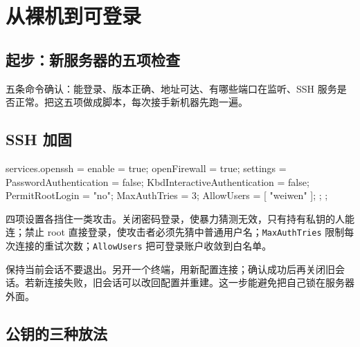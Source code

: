 \chapter{从裸机到可登录}
\label{ch:server-access}

\section{起步：新服务器的五项检查}


五条命令确认：能登录、版本正确、地址可达、有哪些端口在监听、SSH 服务是否正常。把这五项做成脚本，每次接手新机器先跑一遍。

\section{SSH 加固}

\begin{nixcode}
services.openssh = {
  enable = true;
  openFirewall = true;
  settings = {
    PasswordAuthentication = false;
    KbdInteractiveAuthentication = false;
    PermitRootLogin = "no";
    MaxAuthTries = 3;
    AllowUsers = [ "weiwen" ];
  };
};
\end{nixcode}

四项设置各挡住一类攻击。关闭密码登录，使暴力猜测无效，只有持有私钥的人能连；禁止 root 直接登录，使攻击者必须先猜中普通用户名；\texttt{MaxAuthTries} 限制每次连接的重试次数；\texttt{AllowUsers} 把可登录账户收敛到白名单。

\begin{warnbox}
保持当前会话不要退出。另开一个终端，用新配置连接；确认成功后再关闭旧会话。若新连接失败，旧会话可以改回配置并重建。这一步能避免把自己锁在服务器外面。
\end{warnbox}

\section{公钥的三种放法}


